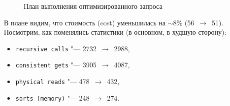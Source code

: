 \begin{figure}[H]%
  \caption{План выполнения оптимизированного запроса}
  \label{fig-task-1-bitmap-plan}
\end{figure}

В плане видим, что стоимость (cost) уменьшилась на $\sim 8$\% (56~$\to$~51). Посмотрим, как поменялись статистики (в основном, в худшую сторону):
\begin{itemize}%
  \item \texttt{recursive calls} "--- 2732~$\to$~2988,
  \item \texttt{consistent gets} "--- 3905~$\to$~4087,
  \item \texttt{physical reads} "--- 478~$\to$~432,
  \item \texttt{sorts (memory)} "--- 248~$\to$~274.
\end{itemize}
